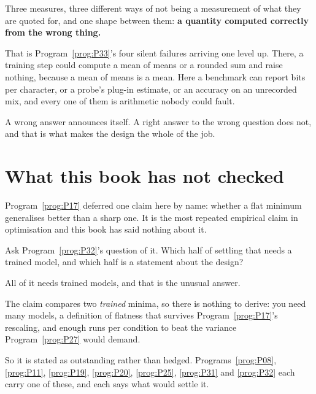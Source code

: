 \begin{fr}
Three measures, three different ways of not being a measurement of what they
are quoted for, and one shape between them: \textbf{a quantity computed
correctly from the wrong thing.}

That is Program~\ref{prog:P33}'s four silent failures arriving one level up.
There, a training step could compute a mean of means or a rounded sum and
raise nothing, because a mean of means is a mean. Here a benchmark can
report bits per character, or a probe's plug-in estimate, or an accuracy on
an unrecorded mix, and every one of them is arithmetic nobody could fault.

A wrong answer announces itself. A right answer to the wrong question does
not, and that is what makes the design the whole of the job.
\end{fr}

\section{What this book has not checked}
\label{sec:P34-not-checked}

\begin{fr}
Program~\ref{prog:P17} deferred one claim here by name: whether a flat
minimum generalises better than a sharp one. It is the most repeated
empirical claim in optimisation and this book has said nothing about it.

Ask Program~\ref{prog:P32}'s question of it. Which half of settling that
needs a trained model, and which half is a statement about the design?
\dotline
\nextframe
\end{fr}

\begin{fr}
\begin{ansblock}
All of it needs trained models, and that is the unusual answer.

The claim compares two \emph{trained} minima, so there is nothing to derive:
you need many models, a definition of flatness that survives
Program~\ref{prog:P17}'s rescaling, and enough runs per condition to beat the
variance Program~\ref{prog:P27} would demand.
\end{ansblock}

So it is stated as outstanding rather than hedged. Programs~\ref{prog:P08},
\ref{prog:P11}, \ref{prog:P19}, \ref{prog:P20}, \ref{prog:P25},
\ref{prog:P31} and \ref{prog:P32} each carry one of these, and each says what
would settle it.
\end{fr}

